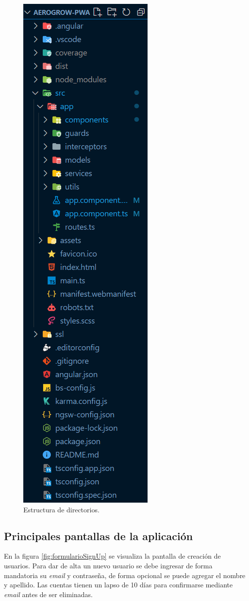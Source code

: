 \begin{figure}[H]
	\centering
	\includegraphics[width=.4\textwidth, height=1.35\linewidth]{./Figures/Estructura de directorios del frontend.png}
	\caption{Estructura de directorios.}
	\label{fig:estructuraDeDirectoriosDelFrontend}
\end{figure}

\subsection{Principales pantallas de la aplicación}

En la figura \ref{fig:formularioSignUp} se visualiza la pantalla de creación de usuarios. Para dar de alta un nuevo usuario se debe ingresar de forma mandatoria su  \textit{email} y contraseña, de forma opcional se puede agregar el nombre y apellido. Las cuentas tienen un lapso de 10 días para confirmarse mediante \textit{email} antes de ser eliminadas.

